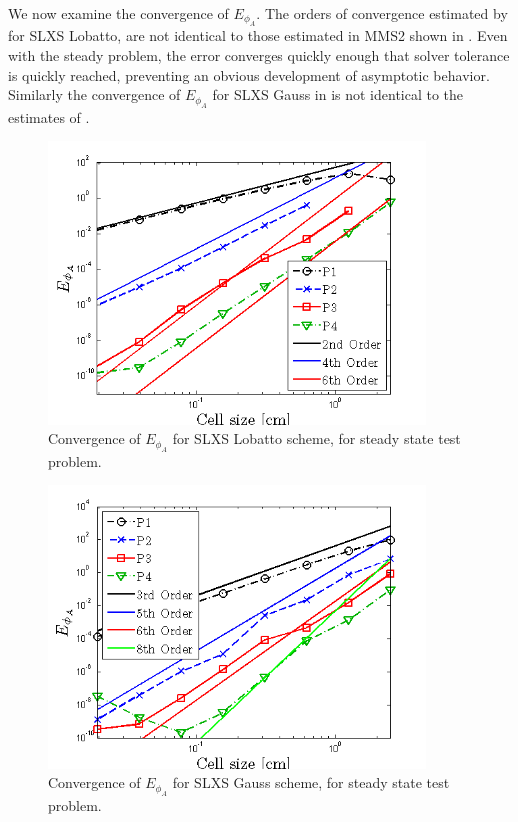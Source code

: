 We now examine the convergence of $E_{\phi_A}$.  
The orders of convergence estimated by  for SLXS Lobatto, are not identical to those estimated in MMS2 shown in .  
Even with the steady problem, the error converges quickly enough that solver tolerance is quickly reached, preventing an obvious development of asymptotic behavior.
Similarly the convergence of $E_{\phi_A}$ for SLXS Gauss in  is not identical to the estimates of .
\begin{figure}[!hbp]
\centering
\includegraphics[width=10cm]{chapter6_grey_radtran/Dissertation_Data/Constant_Time_SLXS_Lobatto_phi_A.png}
\caption{Convergence of $E_{\phi_A}$ for SLXS Lobatto scheme, for steady state test problem.}
\label{fig:constant_time_lobatto_phi_a}
\end{figure}
%
%
\begin{figure}[!htp]
\centering
\includegraphics[width=10cm]{chapter6_grey_radtran/Dissertation_Data/Constant_Time_SLXS_Gauss_phi_A.png}
\caption{Convergence of $E_{\phi_A}$ for SLXS Gauss scheme, for steady state test problem.}
\label{fig:constant_time_gauss_phi_a}
\end{figure}

